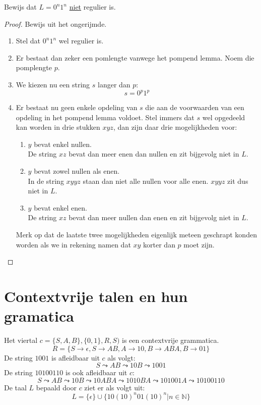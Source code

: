 \documentclass[main.tex]{subfiles}
\begin{document}
\begin{vb}
  Bewijs dat $L = 0^{n}1^{n}$ \underline{niet} regulier is.
  \begin{proof}
    Bewijs uit het ongerijmde.
    \begin{enumerate}
    \item Stel dat $0^{n}1^{n}$ wel regulier is.
    \item Er bestaat dan zeker een pomlengte vanwege het pompend lemma.
      Noem die pomplengte $p$.
    \item We kiezen nu een string $s$ langer dan $p$:
      \[ s = 0^{p}1^{p} \]
    \item Er bestaat nu geen enkele opdeling van $s$ die aan de voorwaarden van een opdeling in het pompend lemma voldoet.
      Stel immers dat $s$ wel opgedeeld kan worden in drie stukken $xyz$, dan zijn daar drie mogelijkheden voor:
      \begin{enumerate}
      \item $y$ bevat enkel nullen.\\
        De string $xz$ bevat dan meer enen dan nullen en zit bijgevolg niet in $L$.
      \item $y$ bevat zowel nullen als enen.\\
        In de string $xyyz$ staan dan niet alle nullen voor alle enen. $xyyz$ zit dus niet in $L$. 
      \item $y$ bevat enkel enen.\\
        De string $xz$ bevat dan meer nullen dan enen en zit bijgevolg niet in $L$.
      \end{enumerate}
      Merk op dat de laatste twee mogelijkheden eigenlijk meteen geschrapt konden worden als we in rekening namen dat $xy$ korter dan $p$ moet zijn.
    \end{enumerate}
  \end{proof}
\end{vb}


\section{Contextvrije talen en hun gramatica}
\label{sec:cont-talen-en}

\begin{vb}
  Het viertal $c = \{ S,A,B \},\{ 0,1 \},R,S)$ is een contextvrije grammatica.
  \[ R = \{ S \rightarrow \epsilon, S \rightarrow AB, A \rightarrow 10, B \rightarrow ABA, B \rightarrow 01 \} \]
  De string $1001$ is afleidbaar uit $c$ als volgt:
  \[ S \leadsto AB \leadsto 10B \leadsto 1001 \]
  De string $10100110$ is ook afleidbaar uit $c$:
  \[ S \leadsto AB \leadsto 10B \leadsto 10ABA \leadsto 1010BA \leadsto 101001A \leadsto 10100110 \]
  De taal $L$ bepaald door $c$ ziet er als volgt uit:
  \[ L = \{\epsilon\} \cup \{ 10 (10)^{n}01(10)^{n} | n \in \mathbb{N}\} \]
\end{vb}
\end{document}
